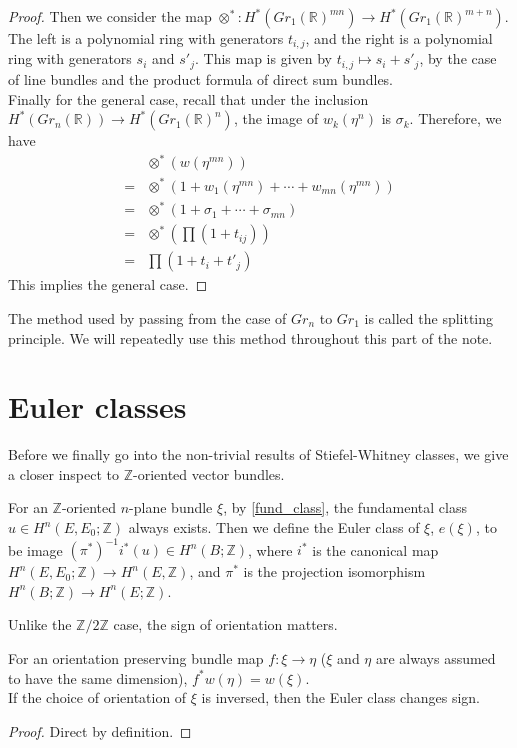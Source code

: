 \begin{proof}
		Then we consider the map $\otimes^*:H^*(Gr_1(\mathbb{R})^{mn})\to H^*(Gr_1(\mathbb{R})^{m+n})$. The left is a polynomial ring with generators $t_{i,j}$, and the right is a polynomial ring with generators $s_i$ and $s'_j$. This map is given by $t_{i,j}\mapsto s_i+s'_j$, by the case of line bundles and the product formula of direct sum bundles. \\
		Finally for the general case, recall that under the inclusion $H^*(Gr_n(\mathbb{R}))\to H^*(Gr_1(\mathbb{R})^n)$, the image of $w_k(\eta^n)$ is $\sigma_k$. Therefore, we have
		\begin{align*}
			&\otimes^*(w(\eta^{mn})) \\
			=&\otimes^*(1+w_1(\eta^{mn})+\cdots+w_{mn}(\eta^{mn})) \\
			=&\otimes^*(1+\sigma_1+\cdots+\sigma_{mn}) \\
			=&\otimes^*(\prod(1+t_{ij})) \\
			=&\prod(1+t_i+t'_j)
		\end{align*}
		This implies the general case. 
	\end{proof}
	\begin{remark}
		The method used by passing from the case of $Gr_n$ to $Gr_1$ is called the splitting principle. We will repeatedly use this method throughout this part of the note. 
	\end{remark}

\section{Euler classes}

	Before we finally go into the non-trivial results of Stiefel-Whitney classes, we give a closer inspect to $\mathbb{Z}$-oriented vector bundles. 
	\begin{defn}
		For an $\mathbb{Z}$-oriented $n$-plane bundle $\xi$, by \cref{fund_class}, the fundamental class $u\in H^n(E,E_0;\mathbb{Z})$ always exists. Then we define the Euler class of $\xi$, $e(\xi)$, to be image $(\pi^*)^{-1}i^*(u)\in H^n(B;\mathbb{Z})$, where $i^*$ is the canonical map $H^n(E,E_0;\mathbb{Z})\to H^n(E,\mathbb{Z})$, and $\pi^*$ is the projection isomorphism $H^n(B;\mathbb{Z})\to H^n(E;\mathbb{Z})$. 
	\end{defn}

	Unlike the $\mathbb{Z}/2\mathbb{Z}$ case, the sign of orientation matters. 
	\begin{coro}
		For an orientation preserving bundle map $f:\xi\to\eta$ ($\xi$ and $\eta$ are always assumed to have the same dimension), $f^*w(\eta)=w(\xi)$. \\
		If the choice of orientation of $\xi$ is inversed, then the Euler class changes sign. 
	\end{coro}
	\begin{proof}
		Direct by definition. 
	\end{proof}

